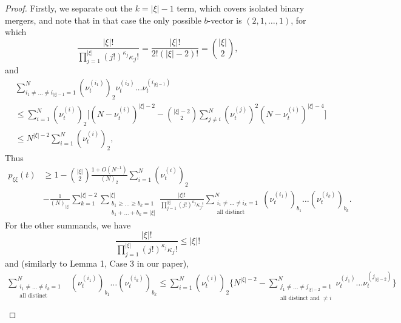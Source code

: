 \documentclass[a4paper,11pt]{article}
\theoremstyle{definition}
\newcommand{\1}{\mathds{1}}
\begin{document}
\begin{proof}
Firstly, we separate out the $k = | \xi | - 1$ term, which covers isolated binary mergers, and note that in that case the only possible $b$-vector is $(2, 1, \ldots, 1)$, for which
\begin{equation*}
\frac{ | \xi |! }{ \prod_{ j = 1 }^{ | \xi | } ( j ! )^{ \kappa_j } \kappa_j ! } = \frac{ | \xi |! }{ 2 ! ( | \xi | - 2 ) ! } = \binom{ | \xi | }{ 2 },
\end{equation*}
and
\begin{align*}
&\sum_{ i_1 \neq \ldots \neq i_{ | \xi | - 1 } = 1 }^N ( \nu_t^{ ( i_1 ) } )_2 \nu_t^{ ( i_2 ) } \ldots \nu_t^{ ( i_{ | \xi | - 1 } ) } \\ 
&\leq \sum_{ i = 1 }^N ( \nu_t^{ ( i ) } )_2 \Bigg[ ( N - \nu_t^{ ( i ) } )^{ | \xi | - 2 } - \binom{ | \xi | - 2 }{ 2 } \sum_{ j \neq i }^N ( \nu_t^{ ( j ) } )^2 ( N - \nu_t^{ ( i ) } )^{ | \xi | - 4 } \Bigg] \\
&\leq N^{ | \xi | - 2 } \sum_{ i = 1 }^N ( \nu_t^{ ( i ) } )_2,
\end{align*}
Thus
\begin{align*}
p_{ \xi \xi }( t ) &\geq 1 - \binom{ | \xi | }{ 2 } \frac{ 1 + O( N^{ -1 } ) }{ ( N )_2 } \sum_{ i = 1 }^N ( \nu_t^{ ( i ) } )_2 \\
&- \frac{ 1 }{ ( N )_{ | \xi | } } \sum_{ k = 1 }^{ | \xi | - 2 } \sum_{ \substack{ b_1 \geq \ldots \geq b_k = 1 \\ b_1 + \ldots + b_k = | \xi | } }^{ | \xi | } \frac{ | \xi |! }{ \prod_{ j = 1 }^{ | \xi | } ( j ! )^{ \kappa_j } \kappa_j ! } \sum_{ \substack{ i_1 \neq \ldots \neq i_k = 1 \\ \text{all distinct} } }^N( \nu_t^{ ( i_1 ) } )_{ b_1 } \ldots ( \nu_t^{ ( i_k ) } )_{ b_k }.
\end{align*}
For the other summands, we have
\begin{equation*}
\frac{ | \xi |! }{ \prod_{ j = 1 }^{ | \xi | } ( j ! )^{ \kappa_j } \kappa_j ! } \leq | \xi | !
\end{equation*}
and (similarly to Lemma 1, Case 3 in our paper),
\begin{align*}
\sum_{ \substack{ i_1 \neq \ldots \neq i_k = 1 \\ \text{all distinct} } }^N &( \nu_t^{ ( i_1 ) } )_{ b_1 } \ldots ( \nu_t^{ ( i_k ) } )_{ b_k } \leq \sum_{ i = 1 }^N ( \nu_t^{ ( i ) } )_2 \Bigg\{ N^{ | \xi | - 2 } - \sum_{ \substack{ j_1 \neq \ldots \neq j_{ | \xi | - 2 } = 1 \\ \text{all distinct and } \neq i } }^N \nu_t^{ ( j_1 ) } \ldots \nu_t^{ ( j_{ | \xi | - 2 } ) } \Bigg\} \\

\end{align*}
\end{proof}
\end{document}
